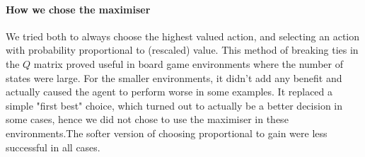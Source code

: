 \paragraph{How we chose the maximiser}
We tried both to always choose
the highest valued action, and selecting an action with probability proportional
to (rescaled) value. This method of breaking ties in the $Q$ matrix proved useful
in board game environments  where the number of states were large. For the smaller
 environments, it didn't add any benefit and actually caused the agent to
perform worse in some examples. It replaced a simple "first best" choice, which turned out
to actually be a better decision in some cases, hence we did not chose to use the maximiser in these environments.The softer version of choosing proportional to
gain were less successful in all cases.



